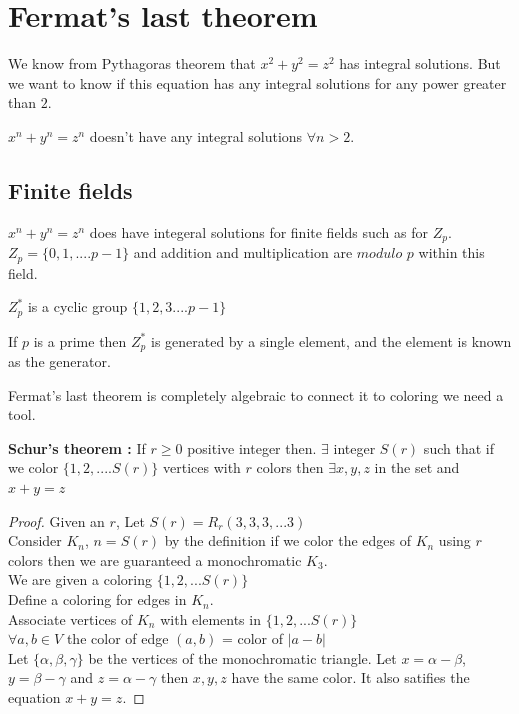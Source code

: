 \section{Fermat's last theorem}
We know from Pythagoras theorem that $x^2 +y^2 = z^2$ has integral solutions. But we want to know if this equation has any integral solutions for any power greater than $2$.
\begin{theorem}
$x^n +y^n = z^n$ doesn't have any integral solutions $\forall n>2$.
\end{theorem}


\subsection{Finite fields}
$x^n +y^n = z^n$ does have integeral solutions for finite fields such as for $Z_p$.\\
$Z_p = \{0,1,....p-1\}$ and addition and multiplication are $modulo$ $p$ within this field.\\

\begin{definition}
$Z_p^*$ is a cyclic group $\{1,2,3....p-1\}$
\end{definition}

\begin{claim}
If $p$ is a prime then $Z_p^*$ is generated by a single element, and the element is known as the generator.
\end{claim}

Fermat's last theorem is completely algebraic to connect it to coloring we need a tool.
\begin{theorem}
\textbf{Schur's theorem :} If $r \geq 0$ positive integer then. $\exists$ integer $S(r)$ such that if we color $\{1,2,....S(r)\}$ vertices with $r$ colors then $\exists x,y,z$ in the set and $x+y =z$
\end{theorem}
\begin{proof}
Given an $r$, Let $S(r) = R_r(3,3,3,...3)$\\
Consider $K_n$, $n = S(r)$ by the definition if we color the edges of $K_n$ using $r$ colors then we are guaranteed a monochromatic $K_3$.\\
We are given a coloring $\{1,2,...S(r)\}$\\
Define a coloring for edges in $K_n$.\\
Associate vertices of $K_n$ with elements in $\{1,2,...S(r)\}$ \\
$\forall a,b\in V$ the color of edge $(a,b) $ = color of $|a-b|$\\

Let $\{\alpha, \beta,\gamma\}$ be the vertices of the monochromatic triangle.
Let $x = \alpha - \beta$, $y = \beta - \gamma$ and $z = \alpha - \gamma$ then $x,y,z$ have the same color.
It also satifies the equation $x+y =z$.
 
\end{proof}

